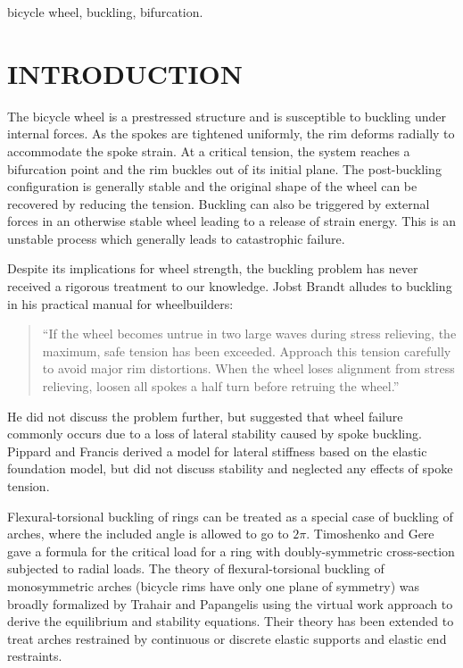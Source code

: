 \documentclass{bmd2016p}
\begin{document}
\begin{keywords}
bicycle wheel, 
buckling, 
bifurcation.
\end{keywords}

\section{INTRODUCTION}

The bicycle wheel is a prestressed structure and is susceptible to buckling under internal forces. As the spokes are tightened uniformly, the rim deforms radially to accommodate the spoke strain. At a critical tension, the system reaches a bifurcation point and the rim buckles out of its initial plane. The post-buckling configuration is generally stable and the original shape of the wheel can be recovered by reducing the tension. Buckling can also be triggered by external forces in an otherwise stable wheel leading to a release of strain energy. This is an unstable process which generally leads to catastrophic failure.

Despite its implications for wheel strength, the buckling problem has never received a rigorous treatment to our knowledge. Jobst Brandt alludes to buckling in his practical manual for wheelbuilders\cite{Brandt1993c}:

\begin{quotation}
\noindent``If the wheel becomes untrue in two large waves during stress relieving, the maximum, safe tension has been exceeded. Approach this tension carefully to avoid major rim distortions. When the wheel loses alignment from stress relieving, loosen all spokes a half turn before retruing the wheel.''
\end{quotation}

He did not discuss the problem further, but suggested that wheel failure commonly occurs due to a loss of lateral stability caused by spoke buckling. Pippard and Francis\cite{Pippard1932d} derived a model for lateral stiffness based on the elastic foundation model, but did not discuss stability and neglected any effects of spoke tension.

Flexural-torsional buckling of rings can be treated as a special case of buckling of arches, where the included angle is allowed to go to $2\pi$. Timoshenko and Gere\cite{Timoshenko1961a} gave a formula for the critical load for a ring with doubly-symmetric cross-section subjected to radial loads. The theory of flexural-torsional buckling of monosymmetric arches (bicycle rims have only one plane of symmetry) was broadly formalized by Trahair and Papangelis\cite{Trahair1987b} using the virtual work approach to derive the equilibrium and stability equations. Their theory has been extended to treat arches restrained by continuous\cite{Pi2002b} or discrete\cite{Bradford2002d} elastic supports and elastic end restraints\cite{Guo2014b}.
\end{document}
